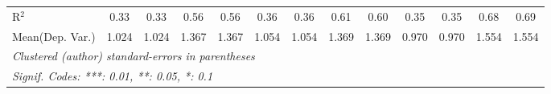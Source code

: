 \begin{tabular}{lcccccccccccc}
   R$^2$                                    & 0.33          & 0.33          & 0.56          & 0.56    & 0.36          & 0.36           & 0.61          & 0.60    & 0.35          & 0.35           & 0.68    & 0.69\\  
Mean(Dep. Var.) & 1.024 & 1.024 & 1.367 & 1.367 & 1.054 & 1.054 & 1.369 & 1.369 & 0.970 & 0.970 & 1.554 & 1.554 \\
   \midrule \midrule
   \multicolumn{13}{l}{\emph{Clustered (author) standard-errors in parentheses}}\\
   \multicolumn{13}{l}{\emph{Signif. Codes: ***: 0.01, **: 0.05, *: 0.1}}\\
\end{tabular}
\par\endgroup
